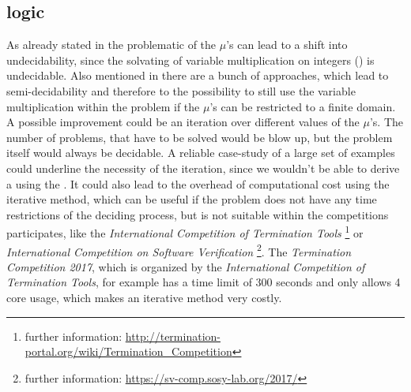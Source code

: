 \subsection{\solver logic}
As already stated in  the problematic of the $\mu$'s can lead to a shift into undecidability, since the solvating of variable multiplication on integers (\qfnia) is undecidable. Also mentioned in  there are a bunch of approaches, which lead to semi-decidability and therefore to the possibility to still use the variable multiplication within the problem if the $\mu$'s can be restricted to a finite domain.\newline
A possible improvement could be an iteration over different values of the $\mu$'s. The number of problems, that have to be solved would be blow up, but the problem itself would always be decidable.\newline
A reliable case-study of a large set of examples could underline the necessity of the iteration, since we wouldn't be able to derive a \gna using the \qfnia. It could also lead to the overhead of computational cost using the iterative method, which can be useful if the problem does not have any time restrictions of the deciding process, but is not suitable within the competitions \aprove participates, like the \textit{International Competition of Termination Tools} \footnote{ further information: \url{http://termination-portal.org/wiki/Termination_Competition} } or \textit{International Competition on Software Verification} \footnote{further information: \url{https://sv-comp.sosy-lab.org/2017/}}. \cite{aproveWebsite} \newline
The \textit{Termination Competition 2017}, which is organized by the \textit{International Competition of Termination Tools}, for example has a time limit of 300 seconds and only allows 4 core usage, which makes an iterative method very costly. \cite{wiki2017termComp}

